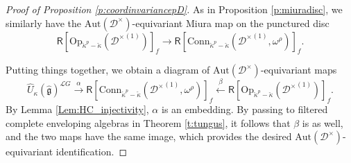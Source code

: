 \documentclass{amsart}
\theoremstyle{definition}
\newcommand{\fh}{\mathfrak{h}}
\newcommand{\fg}{\mathfrak{g}}
\newcommand{\fr}{^\on{(1)}}
\newcommand{\sD}{\mathscr{D}}
\newcommand{\on}{\mathrm}
\newcommand{\Ring}{\mathsf{R}}
\newcommand{\Loop}{\mathscr{L}}
\newcommand{\pD}{\sD^\times}
\newcommand{\ckappa}{\check{\kappa}}
\newcommand{\Conn}{\on{Conn}}
\newcommand{\Op}{\on{Op}}
\newcommand{\Aut}{\on{Aut}}
\numberwithin{equation}{section}
\begin{document}
\begin{proof}[Proof of Proposition \ref{p:coordinvariancepD}]
\fi 
As in Proposition \ref{p:miuradisc}, we similarly have the $\Aut(\pD)$-equivariant  Miura map on the punctured disc
$$\Ring[\Op_{\ckappa^p - \ckappa}({\pD}\fr)]_f \rightarrow \Ring[\Conn_{\ckappa^p - \ckappa}({\pD}\fr, \omega^\rho)]_f.$$

Putting things together, we obtain a diagram of $\Aut(\pD)$-equivariant maps
$$\widehat{U}_\kappa(\hat{\fg})^{\Loop G} \xrightarrow{\alpha}  \Ring[\Conn_{\ckappa^p - \ckappa}({\pD}\fr, \omega^\rho)]_f \xleftarrow{\beta} \Ring[\Op_{\ckappa^p - \ckappa}({\pD}\fr)]_f.$$
By Lemma \ref{Lem:HC_injectivity}, $\alpha$ is an embedding. By passing to filtered complete enveloping algebras in Theorem \ref{t:tungus}, it follows that $\beta$ is as well, and the two maps have the same image, which provides the desired $\Aut(\pD)$-equivariant identification. \end{proof} 

\end{document}
